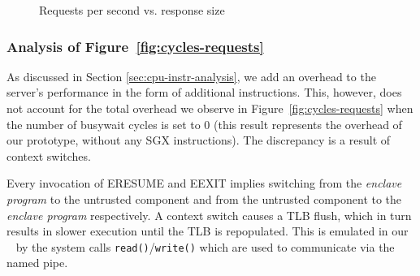 \documentclass[../../../main.tex]{subfiles}
\begin{document}
\begin{figure}[H]
  \centering
  \caption{Requests per second vs. response size}
  \label{fig:sizreqs}
\end{figure}

\subsubsection*{Analysis of Figure~\ref{fig:cycles-requests}}
As discussed in Section \ref{sec:cpu-instr-analysis}, we add an
overhead to the server's performance in the form of additional
instructions. This, however, does not account for the total overhead
we observe in Figure~\ref{fig:cycles-requests} when the number of
busywait cycles is set to 0 (this result represents the overhead of
our prototype, without any SGX instructions). The discrepancy is a
result of context switches.

Every invocation of ERESUME and EEXIT implies switching from the
\textit{enclave program} to the untrusted component and from the
untrusted component to the \textit{enclave program} respectively. A
context switch causes a TLB flush, which in turn results in slower
execution until the TLB is repopulated. This is emulated in our
\enclavemodel~ by the system calls \texttt{read()}/\texttt{write()}
which are used to communicate via the named pipe.
\end{document}
